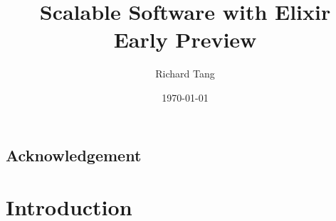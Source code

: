 \documentclass{kdp}
\title{Scalable Software with Elixir \\ Early Preview}
\author{Richard Tang}
\date{\today}
\begin{document}
\maketitle


\section*{Acknowledgement}

\tableofcontents




















\chapter{Introduction}
\end{document}
